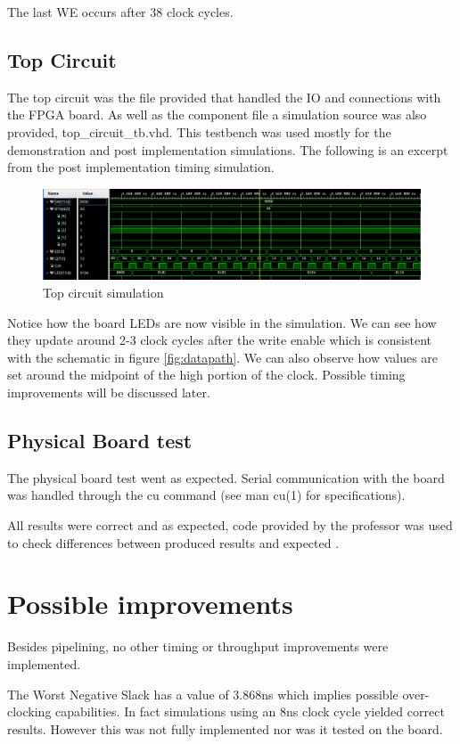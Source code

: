 \documentclass[12pt]{article}
\begin{document}
The last WE occurs after 38 clock cycles.

\subsection{Top Circuit}
The top circuit was the file provided that handled the IO and connections with the FPGA board. As well as the component file a simulation source was also provided, top\_circuit\_tb.vhd. 
This testbench was used mostly for the demonstration and post implementation simulations. The following is an excerpt from the post implementation timing simulation.


\begin{figure}[!htp]
	\centering
	\includegraphics[width=0.7\linewidth]{images/simTopCircuit.png}
	\caption{Top circuit simulation}
	\label{fig:simTopCircuit}
\end{figure}

Notice how the board LEDs are now visible in the simulation. We can see how they update around 2-3 clock cycles after the write enable which is consistent with the schematic in figure \ref{fig:datapath}.
We can also observe how values are set around the midpoint of the high portion of the clock. Possible timing improvements will be discussed later.

\subsection{Physical Board test}
The physical board test went as expected.
Serial communication with the board was handled through the cu command\cite{cu-command} (see man cu(1) for specifications).

All results were correct and as expected, code provided by the professor was used to check differences between produced results and expected \cite{codetcomp}.

\section{Possible improvements}
Besides pipelining, no other timing or throughput improvements were implemented.

The Worst Negative Slack has a value of 3.868ns which implies possible over-clocking capabilities. In fact simulations using an 8ns clock cycle yielded correct results. However this was not fully implemented nor was it tested on the board.
\end{document}
